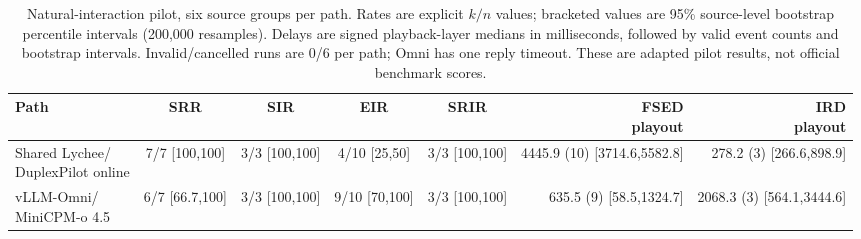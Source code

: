 \begin{table}[tbp]
    \centering
    \small
    \setlength{\tabcolsep}{3.5pt}
    \caption{Natural-interaction pilot, six source groups per path. Rates are explicit $k/n$ values; bracketed values are 95\% source-level bootstrap percentile intervals (200,000 resamples). Delays are signed playback-layer medians in milliseconds, followed by valid event counts and bootstrap intervals. Invalid/cancelled runs are 0/6 per path; Omni has one reply timeout. These are adapted pilot results, not official benchmark scores.}
    \label{tab:interaction_metrics}
    \begin{tabular}{@{}lccccrr@{}}
        \toprule
        Path & SRR & SIR & EIR & SRIR & \shortstack{FSED\\playout} & \shortstack{IRD\\playout} \\
        \midrule
        \shortstack[l]{Shared Lychee/\\DuplexPilot online} & 7/7 [100,100] & 3/3 [100,100] & 4/10 [25,50] & 3/3 [100,100] & 4445.9 (10) [3714.6,5582.8] & 278.2 (3) [266.6,898.9] \\
        \shortstack[l]{vLLM-Omni/\\MiniCPM-o 4.5} & 6/7 [66.7,100] & 3/3 [100,100] & 9/10 [70,100] & 3/3 [100,100] & 635.5 (9) [58.5,1324.7] & 2068.3 (3) [564.1,3444.6] \\
        \bottomrule
    \end{tabular}
\end{table}
